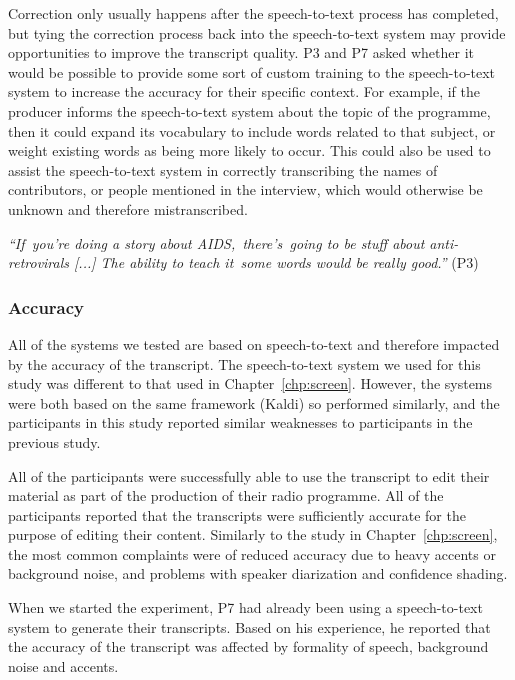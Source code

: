 
Correction only usually happens after the speech-to-text process has completed, but tying the correction process back
into the speech-to-text system may provide opportunities to improve the transcript quality.  P3 and P7 asked whether it
would be possible to provide some sort of custom training to the speech-to-text system to increase the accuracy for
their specific context. For example, if the producer informs the speech-to-text system about the topic of the
programme, then it could expand its vocabulary to include words related to that subject, or weight existing words as
being more likely to occur. This could also be used to assist the speech-to-text system in correctly transcribing the
names of contributors, or people mentioned in the interview, which would otherwise be unknown and therefore
mistranscribed.

\textit{``If you're doing a story about AIDS, there's going to be stuff about anti-retrovirals [...]
The ability to teach it some words would be really good.''} (P3)

\subsubsection{Accuracy}

All of the systems we tested are based on speech-to-text and therefore impacted by the accuracy of the transcript.  The
speech-to-text system we used for this study was different to that used in Chapter~\ref{chp:screen}.  However, the
systems were both based on the same framework (Kaldi) so performed similarly, and the participants in this study
reported similar weaknesses to participants in the previous study.

All of the participants were successfully able to use the transcript to edit their material as part of the production
of their radio programme. All of the participants reported that the transcripts were sufficiently accurate for the
purpose of editing their content. Similarly to the study in Chapter~\ref{chp:screen}, the most common complaints were
of reduced accuracy due to heavy accents or background noise, and problems with speaker diarization and confidence
shading.

When we started the experiment, P7 had already been using a speech-to-text system to generate their transcripts. Based
on his experience, he reported that the accuracy of the transcript was affected by formality of speech, background
noise and accents.

